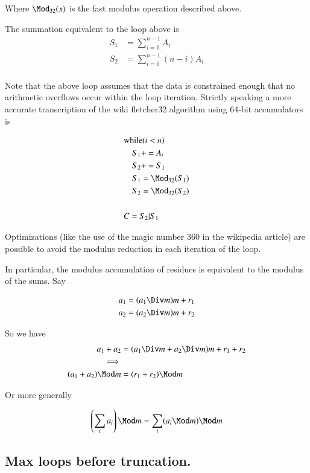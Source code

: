 Where $\Mod_{32}(x)$ is the fast modulus operation described above.

The summation equivalent to the loop above is
\begin{align*}
S_1 &= \sum_{i=0}^{n-1} A_i \\
S_2 &= \sum_{i=0}^{n-1} (n-i)A_i \\
\end{align*}

Note that the above loop assumes that the data is constrained enough that no arithmetic overflows occur within the loop iteration.
Strictly speaking a more accurate transcription of the wiki fletcher32 algorithm using 64-bit accumulators is

\begin{align*}
&\text{while} ( i < n )  \\
&\quad   S_1 += A_i \\
&\quad   S_2 += S_1 \\
&\quad   S_1 = \Mod_{32}(S_1) \\
&\quad   S_2 = \Mod_{32}(S_2) \\
\\
&C = S_2 | S_1
\end{align*}

Optimizations (like the use of the magic number 360 in the wikipedia article) are possible to avoid the modulus reduction in each iteration of the loop.

In particular, the modulus accumulation of residues is equivalent to the modulus of the sums.  Say

\begin{align*}
a_1 &= (a_1 \Div m ) m + r_1 \\
a_2 &= (a_2 \Div m ) m + r_2
\end{align*}

So we have
\begin{align*}
a_1 + a_2 &= (a_1 \Div m + a_2 \Div m ) m + r_1 + r_2 \\
\implies \\
(a_1 + a_2) \Mod m &= (r_1 + r_2) \Mod m \\
\end{align*}

Or more generally

\begin{align*}
\left(\sum_i a_i \right) \Mod m &= \sum_i (a_i \Mod m) \Mod m \\
\end{align*}

\subsection{Max loops before truncation. }

